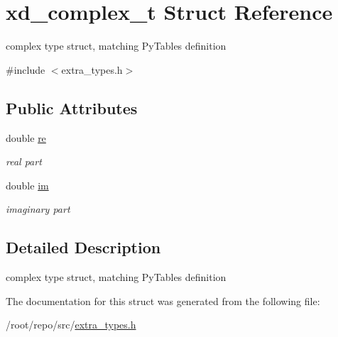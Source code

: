 \hypertarget{structxd__complex__t}{}\section{xd\+\_\+complex\+\_\+t Struct Reference}
\label{structxd__complex__t}


complex type struct, matching Py\+Tables definition  




{\ttfamily \#include $<$extra\+\_\+types.\+h$>$}

\subsection*{Public Attributes}
\begin{DoxyCompactItemize}
\item 
\mbox{\label{structxd__complex__t_afbbb6ed1fe3b729258421cb3eaa8c4d8}} 
double \hyperlink{structxd__complex__t_afbbb6ed1fe3b729258421cb3eaa8c4d8}{re}
\begin{DoxyCompactList}\small\item\em real part \end{DoxyCompactList}\item 
\mbox{\label{structxd__complex__t_afb1d09ccfa0e10044572c8a7bf4806f2}} 
double \hyperlink{structxd__complex__t_afb1d09ccfa0e10044572c8a7bf4806f2}{im}
\begin{DoxyCompactList}\small\item\em imaginary part \end{DoxyCompactList}\end{DoxyCompactItemize}


\subsection{Detailed Description}
complex type struct, matching Py\+Tables definition 

The documentation for this struct was generated from the following file\+:\begin{DoxyCompactItemize}
\item 
/root/repo/src/\hyperlink{extra__types_8h}{extra\+\_\+types.\+h}\end{DoxyCompactItemize}
